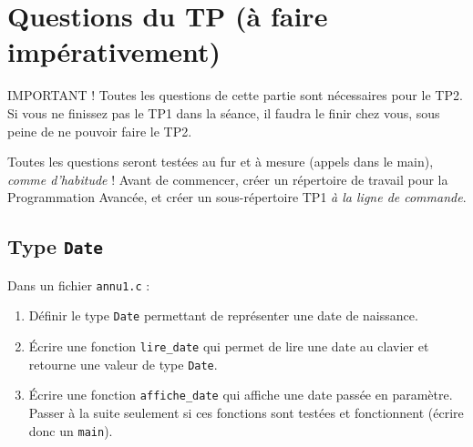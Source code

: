 \documentclass[final, pdftex, a4paper, openbib, ]{article}
\newcommand{\alertwarningbox}[1]{
    \centering
    \begin{tabularx}{0.9\linewidth}{
        >{\columncolor{warningbackground}}c
        >{\columncolor{warningbackground}}X}
        \raisebox{\dimexpr2\baselineskip-\height}
        {\texttt{[image: attention.pdf]}}&
        \raisebox{\tabcolsep}{\strut}#1\raisebox{-\tabcolsep}{\strut}
    \end{tabularx}
}
\begin{document}
\section{Questions du TP \large (à faire impérativement)}


\begin{alertinfo}{IMPORTANT !}
Toutes les questions de cette partie sont nécessaires pour le TP2. Si vous ne finissez pas le TP1 dans la séance, il faudra le finir chez vous, sous peine de ne pouvoir faire le TP2.
\end{alertinfo}

Toutes les questions seront testées au fur et à mesure (appels dans le main), \textit{comme d’habitude} !
Avant de commencer, créer un répertoire de travail pour la Programmation Avancée, et
créer un sous-répertoire TP1 \textit{à la ligne de commande}.


\subsection{Type \texttt{Date}}
Dans un fichier \texttt{annu1.c} :
\begin{enumerate}
	\item Définir le type \texttt{Date} permettant de représenter une date de naissance.
	\item Écrire une fonction \texttt{lire\_date} qui permet de lire une date au clavier et retourne une valeur de type \texttt{Date}.
	\item Écrire une fonction \texttt{affiche\_date} qui affiche une date passée en paramètre.
	Passer à la suite seulement si ces fonctions sont testées et fonctionnent (écrire donc un \texttt{main}).
\end{enumerate}
\end{document}
